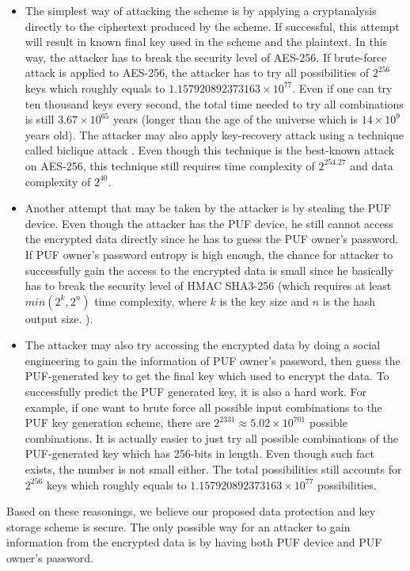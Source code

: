 \begin{itemize}
  \item The simplest way of attacking the scheme is by applying a cryptanalysis directly to the ciphertext produced by the scheme. If successful, this attempt will result in known final key used in the scheme and the plaintext.  In this way, the attacker has to break the security level of AES-256. If brute-force attack is applied to AES-256, the attacker has to try all possibilities of $2^{256}$ keys which roughly equals to $1.157920892373163 \times 10^{77}$. Even if one can try ten thousand keys every second, the total time needed to try all combinations is still $3.67 \times 10^{65}$ years (longer than the age of the universe which is $14 \times 10^9$ years old).
  The attacker may also apply key-recovery attack using a technique called biclique attack \cite{10.1007/978-3-319-19962-7_3}. Even though this technique is the best-known attack on AES-256, this technique still requires time complexity of $2^{254.27}$ and data complexity of $2^{40}$.
  \item Another attempt that may be taken by the attacker is by stealing the PUF device. Even though the attacker has the PUF device, he still cannot access the encrypted data directly since he has to guess the PUF owner's password. If PUF owner's password entropy is high enough, the chance for attacker to successfully gain the access to the encrypted data is small since he basically has to break the security level of HMAC SHA3-256 (which requires at least $min(2^k, 2^n)$ time complexity, where $k$ is the key size and $n$ is the hash output size. \cite{hmac_security}).
  \item The attacker may also try accessing the encrypted data by doing a social engineering to gain the information of PUF owner's password, then guess the PUF-generated key to get the final key which used to encrypt the data. To successfully predict the PUF generated key, it is also a hard work. For example, if one want to brute force all possible input combinations to the PUF key generation scheme, there are $2^{2331} \approx 5.02 \times 10^{701}$ possible combinations. It is actually easier to just try all possible combinations of the PUF-generated key which has 256-bits in length. Even though such fact exists, the number is not small either. The total possibilities still accounts for $2^{256}$ keys which roughly equals to $1.157920892373163 \times 10^{77}$ possibilities.
\end{itemize}
Based on these reasonings, we believe our proposed data protection and key storage scheme is secure. The only possible way for an attacker to gain information from the encrypted data is by having both PUF device and PUF owner's password.

